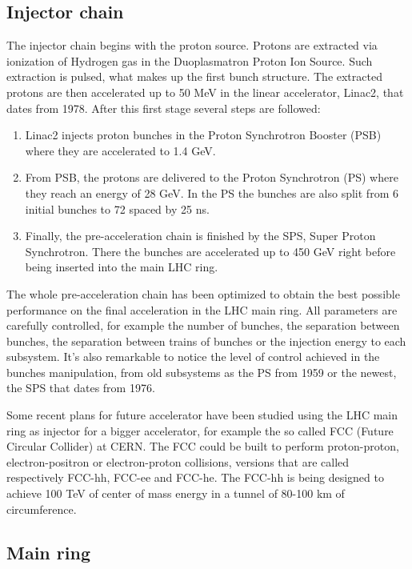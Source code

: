 \subsection{Injector chain}
\label{sec:injector}

The injector chain begins with the proton source. Protons are extracted via ionization of Hydrogen gas in the Duoplasmatron Proton Ion Source. Such extraction is pulsed, what makes up the first bunch structure. The extracted protons are then accelerated up to 50 MeV in the linear accelerator, Linac2, that dates from 1978. After this first stage several steps are followed:
\begin{enumerate}
\item Linac2 injects proton bunches in the Proton Synchrotron Booster (PSB) where they are accelerated to 1.4 GeV. 
\item From PSB, the protons are delivered to the Proton Synchrotron (PS) where they reach an energy of 28 GeV. In the PS the bunches are also split from 6 initial bunches to 72 spaced by 25 ns.
\item Finally, the pre-acceleration chain is finished by the SPS, Super Proton Synchrotron. There the bunches are accelerated up to 450 GeV right before being inserted into the main LHC ring. 
\end{enumerate}

The whole pre-acceleration chain has been optimized to obtain the best possible performance on the final acceleration in the LHC main ring. All parameters are carefully controlled, for example the number of bunches, the separation between bunches, the separation between trains of bunches or the injection energy to each subsystem. It's also remarkable to notice the level of control achieved in the bunches manipulation, from old subsystems as the PS from 1959 or the newest, the SPS that dates from 1976. 

Some recent plans for future accelerator have been studied using the LHC main ring as injector for a bigger accelerator, for example the so called FCC (Future Circular Collider) at CERN. The FCC could be built to perform proton-proton, electron-positron or electron-proton collisions, versions that are called respectively FCC-hh, FCC-ee and FCC-he. The FCC-hh is being designed to achieve 100 TeV of center of mass energy in a tunnel of 80-100 km of circumference. 

\subsection{Main ring}
\label{sec:ring}

